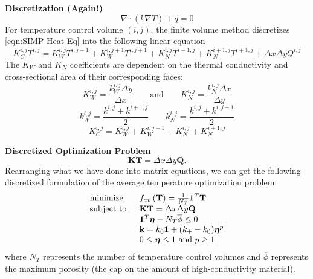 \documentclass[final]{beamer}
\begin{document}
\begin{frame}{\textbf{Discretization (Again!)}}
	\begin{equation}
		\nabla\cdot\left(k\nabla T\right)+q=0\label{eqn:SIMP-Heat-Eq}
	\end{equation}\pause
	For temperature control volume $(i,j)$, the finite volume method discretizes \eqref{eqn:SIMP-Heat-Eq} into the following linear equation
	{\small
		\begin{equation}
			K^{i,j}_C T^{i,j}=K_W^{i,j}T^{i,j-1}+K_W^{i,j+1}T^{i,j+1}+K_N^{i,j}T^{i-1,j}+K_N^{i+1,j}T^{i+1,j}+\Delta x\Delta y Q^{i,j}\label{eqn:FVM-Discret}
		\end{equation}}\pause
	The $K_W$ and $K_N$ coefficients are dependent on the thermal conductivity and cross-sectional area of their corresponding faces:
	\begin{equation}
		K_W^{i,j}=\frac{k_W^{i,j}\Delta y}{\Delta x}\qquad\text{and}\qquad K_N^{i,j}=\frac{k_N^{i,j}\Delta x}{\Delta y}\label{eqn:K-Coeffs}
	\end{equation}
	\begin{equation}
		k^{i,j}_W=\frac{k^{i,j}+k^{i+1,j}}{2}\qquad k^{i,j}_N=\frac{k^{i,j}+k^{i,j+1}}{2}
	\end{equation}\pause
	\begin{equation}
		K^{i,j}_C=K_W^{i,j}+K_W^{i,j+1}+K_N^{i,j}+K_N^{i+1,j}\label{eqn:CenterFluxCoeff}
	\end{equation}
\end{frame}

\begin{frame}{\textbf{Discretized Optimization Problem}}
	\begin{equation}
		\mathbf{K}\mathbf{T}=\Delta x\Delta y\mathbf{Q}.\label{eqn:KTQ-Matrix-Eqn}
	\end{equation}\pause
	Rearranging what we have done into matrix equations, we can get the following discretized formulation of the average temperature optimization problem:
	\begin{equation}
		\begin{tabular}{ll}
			$\text{minimize}$  & $f_{av}\left({\mathbf{T}}\right)=\frac{1}{N_T}\mathbf{1}^T\mathbf{T}$                                                                                     \\
			\text{subject to } & $\mathbf{K}\mathbf{T}=\Delta x\Delta y\mathbf{Q}$                                                                   \\
			& $\mathbf{1}^T\boldsymbol{\eta}-N_T\overline{\phi}\leq0$ \\
			& $\mathbf{k}=k_0\mathbf{1}+(k_+-k_0)\boldsymbol{\eta}^p$                                       \\
			& $0\leq\boldsymbol{\eta}\leq 1\text{ and } p\geq 1$
		\end{tabular}\label{Implementation-SIMP-Optimization-Problem}
	\end{equation}
	where $N_T$ represents the {\color{baystate}number of temperature control volumes} and $\overline{\phi}$ represents the {\color{baystate}maximum porosity} (the cap on the amount of high-conductivity material).
\end{frame}
\end{document}
